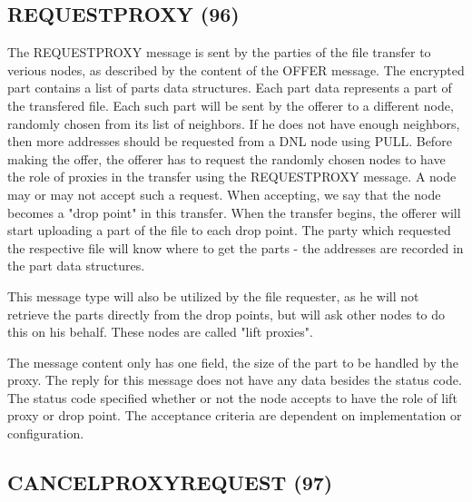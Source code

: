 \subsection{REQUESTPROXY (96)}

The REQUESTPROXY message is sent by the parties of the file transfer to verious
nodes, as described by the content of the OFFER message. The encrypted part
contains a list of parts data structures. Each part data represents a part of
the transfered file. Each such part will be sent by the offerer to a different
node, randomly chosen from its list of neighbors. If he does not have enough
neighbors, then more addresses should be requested from a DNL node using PULL.
Before making the offer, the offerer has to request the randomly chosen nodes
to have the role of proxies in the transfer using the REQUESTPROXY message.
A node may or may not accept such a request. When accepting, we say that the
node becomes a "drop point" in this transfer. When the transfer begins, the
offerer will start uploading a part of the file to each drop point. The party
which requested the respective file will know where to get the parts - the 
addresses are recorded in the part data structures.

This message type will also be utilized by the file requester, as he will not
retrieve the parts directly from the drop points, but will ask other nodes to
do this on his behalf. These nodes are called "lift proxies".

The message content only has one field, the size of the part to be handled by
the proxy. The reply for this message does not have any data besides the status
code. The status code specified whether or not the node accepts to have the
role of lift proxy or drop point. The acceptance criteria are dependent on
implementation or configuration.

\begin{figure}[H]
    \centering
\end{figure}

\subsection{CANCELPROXYREQUEST (97)}

